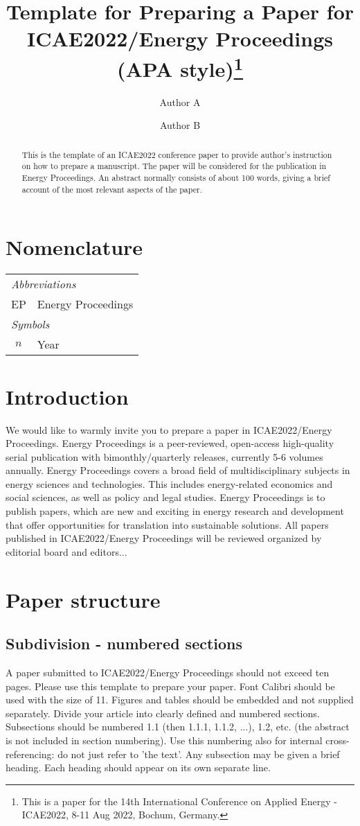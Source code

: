 \documentclass[11pt,a4paper,twoside,twocolumn]{article}
\title{\bfseries Template for Preparing a Paper for ICAE2022/Energy Proceedings (APA style)\footnote{This is a paper for the 14th International Conference on Applied Energy - ICAE2022, 8-11 Aug 2022, Bochum, Germany.}}
\author[1]{Author A}
\author[1,2,*]{Author B}
\affil[1]{Affiliation of author A}
\affil[2]{Affiliation of author B}
\affil[*]{Corresponding author.}
\date{}
\begin{document}
\maketitle
\thispagestyle{fancy}

\begin{abstract}
    This is the template of an ICAE2022 conference paper to provide author’s instruction on how to prepare a manuscript. The paper will be considered for the publication in Energy Proceedings. An abstract normally consists of about 100 words, giving a brief account of the most relevant aspects of the paper.
\end{abstract}

\section*{Nomenclature}
\begin{tabularx}{\linewidth}{|cX|}
\hline
    \multicolumn{2}{|l|}{\itshape Abbreviations}\\
    EP & Energy Proceedings \\
    \multicolumn{2}{|l|}{\itshape Symbols}\\
    $n$ & Year  \\
\hline
\end{tabularx}

\section{Introduction}
We would like to warmly invite you to prepare a paper in ICAE2022/Energy Proceedings. Energy Proceedings is a peer-reviewed, open-access high-quality serial publication with bimonthly/quarterly releases, currently 5-6 volumes annually. Energy Proceedings covers a broad field of multidisciplinary subjects in energy sciences and 
technologies. This includes energy-related economics and social sciences, as well as policy and legal studies.
Energy Proceedings is to publish papers, which are new and exciting in energy research and development that offer opportunities for translation into sustainable solutions.
All papers published in ICAE2022/Energy Proceedings will be reviewed organized by editorial board and editors...

\section{Paper structure}
\subsection{Subdivision - numbered sections}
A paper submitted to ICAE2022/Energy Proceedings should not exceed ten pages. Please use this template to prepare your paper. Font Calibri should be used with the size of 11. Figures and tables should be embedded and not supplied separately.
Divide your article into clearly defined and numbered sections. Subsections should be numbered 1.1 (then 1.1.1, 1.1.2, ...), 1.2, etc. (the abstract is not included in section numbering). Use this numbering also for internal cross-referencing: do not just refer to 'the text'. Any subsection may be given a brief heading. Each heading should appear on its own separate line.
\end{document}
